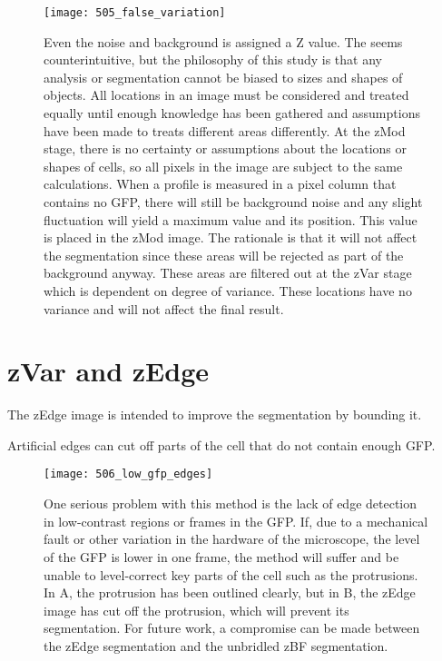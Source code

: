 \begin{figure}[h!]
 \centering
 \texttt{[image: 505\_false\_variation]}
 \caption[False Z variation]{
 	Even the noise and background is assigned a Z value. The seems counterintuitive, but the philosophy of this study is that any analysis or segmentation cannot be biased to sizes and shapes of objects. All locations in an image must be considered and treated equally until enough knowledge has been gathered and assumptions have been made to treats different areas differently. At the zMod stage, there is no certainty or assumptions about the locations or shapes of cells, so all pixels in the image are subject to the same calculations. When a profile is measured in a pixel column that contains no GFP, there will still be background noise and any slight fluctuation will yield a maximum value and its position. This value is placed in the zMod image. The rationale is that it will not affect the segmentation since these areas will be rejected as part of the background anyway. These areas are filtered out at the zVar stage which is dependent on degree of variance. These locations have no variance and will not affect the final result.
 }
 \label{fig:falsezvariation}
\end{figure}

\section{zVar and zEdge}

The zEdge image is intended to improve the segmentation by bounding it.

Artificial edges can cut off parts of the cell that do not contain enough GFP.

\begin{figure}[h!]
 \centering
 \texttt{[image: 506\_low\_gfp\_edges]}
 \caption[Edges in low GFP regions]{
 	One serious problem with this method is the lack of edge detection in low-contrast regions or frames in the GFP. If, due to a mechanical fault or other variation in the hardware of the microscope, the level of the GFP is lower in one frame, the method will suffer and be unable to level-correct key parts of the cell such as the protrusions. In A, the protrusion has been outlined clearly, but in B, the zEdge image has cut off the protrusion, which will prevent its segmentation. For future work, a compromise can be made between the zEdge segmentation and the unbridled zBF segmentation.
 }
 \label{fig:lowgfp}
\end{figure}

